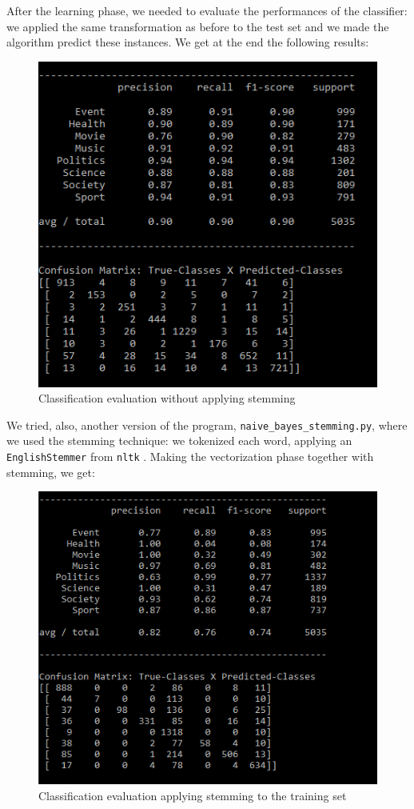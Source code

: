 \documentclass[journal,11pt]{vgtc}
\begin{document}
After the learning phase, we needed to evaluate the performances of the classifier: we applied the same transformation as before
to the test set and we made the algorithm predict these instances. We get at the end the following results:

\begin{figure}[h]
 \centering
 \includegraphics[scale=0.5]{naive_bayes_no_stemming}
 \caption{Classification evaluation without applying stemming}
\end{figure}

We tried, also, another version of the program, \texttt{naive\_bayes\_stemming.py}, where we used the stemming technique:
we tokenized each word, applying an \texttt{EnglishStemmer} from \texttt{nltk} \cite{nltk}.
Making the vectorization phase together with stemming, we get:

\begin{figure}[h]
 \centering
 \includegraphics[scale=0.5]{naive_bayes_stemming}
 \caption{Classification evaluation applying stemming to the training set}
\end{figure}
\end{document}
